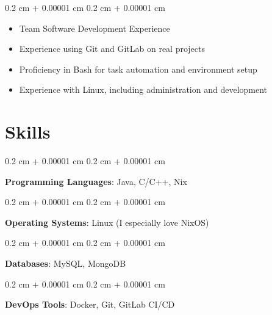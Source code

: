 \documentclass[10pt, letterpaper]{article}
\newenvironment{highlights}{
    \begin{itemize}[
        topsep=0.20 cm,
        parsep=0.20 cm,
        partopsep=0pt,
        itemsep=0pt,
        leftmargin=0.4 cm + 10pt
    ]
}{
    \end{itemize}
} %
\newenvironment{onecolentry}{
    \begin{adjustwidth}{
        0.2 cm + 0.00001 cm
    }{
        0.2 cm + 0.00001 cm
    }
}{
    \end{adjustwidth}
} %
\begin{document}
        \begin{onecolentry}
            \begin{highlights}
                \item Team Software Development Experience
                \item Experience using Git and GitLab on real projects
                \item Proficiency in Bash for task automation and environment setup
                \item Experience with Linux, including administration and development

            \end{highlights}
        \end{onecolentry}

    \section{Skills}

        \begin{onecolentry}
            \textbf{Programming Languages}: Java, C/C++, Nix
        \end{onecolentry}
         \vspace{0.2 cm}

        \begin{onecolentry}
            \textbf{Operating Systems}: Linux (I especially love NixOS)
        \end{onecolentry}
        \vspace{0.2 cm}

        \begin{onecolentry}
            \textbf{Databases}: MySQL, MongoDB
        \end{onecolentry}
        \vspace{0.2 cm}

        \begin{onecolentry}
            \textbf{DevOps Tools}: Docker, Git, GitLab CI/CD
        \end{onecolentry}
\end{document}
